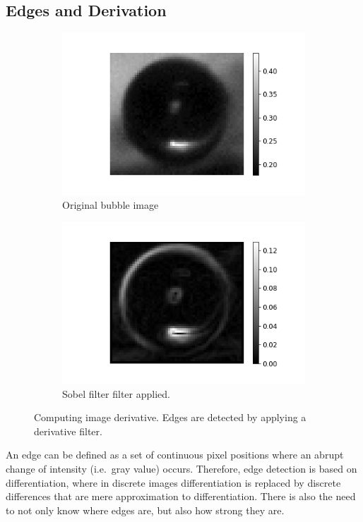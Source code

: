 		\subsection{Edges and Derivation}
		\begin{figure}
			\centering
			\begin{subfigure}[t]{.4\linewidth}
				\includegraphics[scale=0.4]{images/green_one.png}
				\caption{Original bubble image}
			\end{subfigure}\hfill
			\begin{subfigure}[t]{.4\linewidth}
				\includegraphics[scale=0.4]{images/green_one_sobel.png}
				\caption{Sobel filter filter applied.}
			\end{subfigure}
			
			\caption{Computing image derivative. Edges are detected by applying a derivative filter.}
			\label{fig:sobel_demo}
		\end{figure}
		An edge can be defined as a set of continuous pixel positions where an abrupt change of intensity (i.e.\ gray value) occurs. Therefore, edge detection is based on differentiation, where in discrete images differentiation is replaced by discrete differences that are mere approximation to differentiation. There is also the need to not only know where edges are, but also how strong they are.
		
